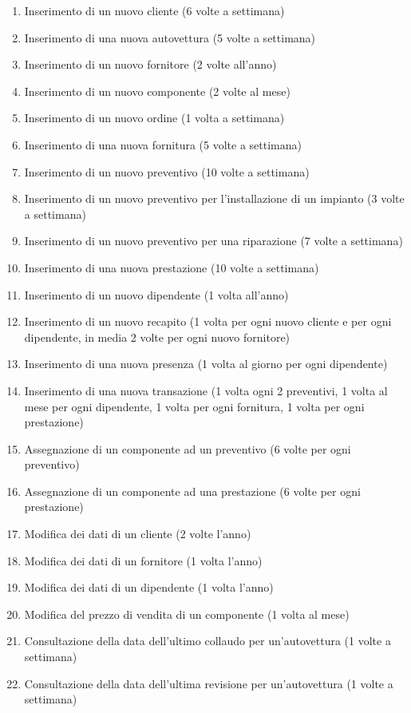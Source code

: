 \begin{enumerate}
			\item Inserimento di un nuovo cliente (6 volte a settimana)
			\item Inserimento di una nuova autovettura (5 volte a settimana)
			\item Inserimento di un nuovo fornitore (2 volte all’anno)
			\item Inserimento di un nuovo componente (2 volte al mese)
			\item Inserimento di un nuovo ordine (1 volta a settimana)
			\item Inserimento di una nuova fornitura (5 volte a settimana)
			\item Inserimento di un nuovo preventivo (10 volte a settimana)
			\item Inserimento di un nuovo preventivo per l’installazione di un impianto (3 volte a settimana)
			\item Inserimento di un nuovo preventivo per una riparazione (7 volte a settimana)
			\item Inserimento di una nuova prestazione (10 volte a settimana)
			\item Inserimento di un nuovo dipendente (1 volta all’anno)
			\item Inserimento di un nuovo recapito (1 volta per ogni nuovo cliente e per ogni dipendente, in media 2 volte per ogni nuovo fornitore)
			\item Inserimento di una nuova presenza (1 volta al giorno per ogni dipendente)
			\item Inserimento di una nuova transazione (1 volta ogni 2 preventivi, 1 volta al mese per ogni dipendente, 1 volta per ogni fornitura, 1 volta per ogni prestazione)
			\item Assegnazione di un componente ad un preventivo (6 volte per ogni preventivo)
			\item Assegnazione di un componente ad una prestazione (6 volte per ogni prestazione)
			\item Modifica dei dati di un cliente (2 volte l’anno)
			\item Modifica dei dati di un fornitore (1 volta l’anno)
			\item Modifica dei dati di un dipendente (1 volta l’anno)
			\item Modifica del prezzo di vendita di un componente (1 volta al mese)
			\item Consultazione della data dell’ultimo collaudo per un’autovettura (1 volte a settimana)
			\item Consultazione della data dell’ultima revisione per un’autovettura (1 volte a settimana)

\end{enumerate}
